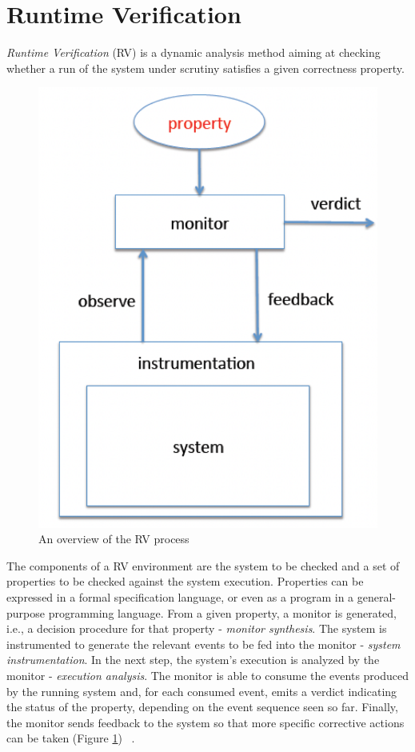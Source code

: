     \section{Runtime Verification}
    \textit{Runtime Verification} (RV) is a dynamic analysis method aiming at checking whether a run of the system under scrutiny satisfies a given correctness property.

  \begin{figure}
    \centering
    \includegraphics [scale=0.4]{Images/rv.png}
    \caption{An overview of the RV process}
    \label{rv}
\end{figure}

 The components of a RV environment are the system to be checked and a set of properties to be checked against the system execution. Properties can be expressed in a formal specification language, or even as a program in a general-purpose programming language. From a given property, a monitor is generated, i.e., a decision procedure for that property - \textit{monitor synthesis}. The system is instrumented to generate the relevant events to be fed into the monitor - \textit{system instrumentation}. In the next step, the system's execution is analyzed by the monitor - \textit{execution analysis}. The monitor is able to consume the events produced by the running system and, for each consumed event, emits a verdict indicating the status of the property, depending on the event sequence seen so far. Finally, the monitor sends feedback to the system so that more specific corrective actions can be taken (Figure \ref{rv}) ~\cite{rvart}.
 
